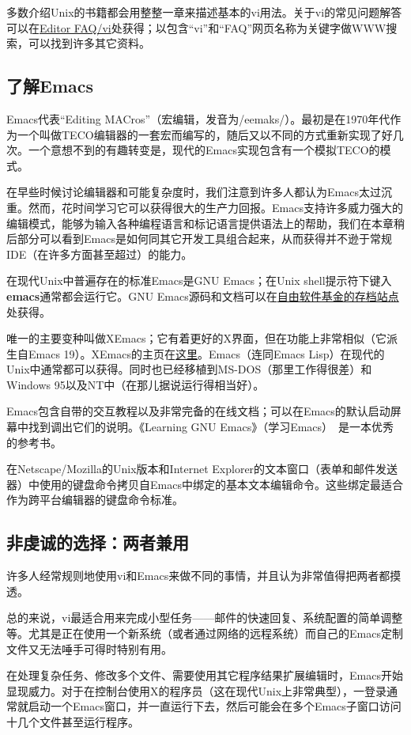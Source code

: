 \documentclass[12pt,oneside]{ctexbook}
\begin{document}
\begin{common-format}
多数介绍Unix的书籍都会用整整一章来描述基本的vi用法。关于vi的常见问题解答可以在\href{http://www.faqs.org/faqs/editor-faq/vi/}{Editor FAQ/vi}处获得；以包含“vi”和“FAQ”网页名称为关键字做WWW搜索，可以找到许多其它资料。


\subsection{了解Emacs}
Emacs代表“Editing MACros”（宏编辑，发音为/eemaks/）。最初是在1970年代作为一个叫做TECO编辑器的一套宏而编写的，随后又以不同的方式重新实现了好几次。一个意想不到的有趣转变是，现代的Emacs实现包含有一个模拟TECO的模式。

在早些时候讨论编辑器和可能复杂度时，我们注意到许多人都认为Emacs太过沉重。然而，花时间学习它可以获得很大的生产力回报。Emacs支持许多威力强大的编辑模式，能够为输入各种编程语言和标记语言提供语法上的帮助，我们在本章稍后部分可以看到Emacs是如何同其它开发工具组合起来，从而获得并不逊于常规IDE（在许多方面甚至超过）的能力。

在现代Unix中普遍存在的标准Emacs是GNU Emacs；在Unix shell提示符下键入\textbf{emacs}通常都会运行它。GNU Emacs源码和文档可以在\href{ftp://gnu.org/pub/gnu}{自由软件基金的存档站点}处获得。

唯一的主要变种叫做XEmacs；它有着更好的X界面，但在功能上非常相似（它派生自Emacs 19）。XEmacs的主页在\href{http://www.xemacs.org/}{这里}。Emacs（连同Emacs Lisp）在现代的Unix中通常都可以获得。同时也已经移植到MS-DOS（那里工作得很差）和Windows 95以及NT中（在那儿据说运行得相当好）。

Emacs包含自带的交互教程以及非常完备的在线文档；可以在Emacs的默认启动屏幕中找到调出它们的说明。《Learning GNU Emacs》（学习Emacs）~\cite{Cameron}是一本优秀的参考书。

在Netscape/Mozilla的Unix版本和Internet Explorer的文本窗口（表单和邮件发送器）中使用的键盘命令拷贝自Emacs中绑定的基本文本编辑命令。这些绑定最适合作为跨平台编辑器的键盘命令标准。

\subsection{非虔诚的选择：两者兼用}
许多人经常规则地使用vi和Emacs来做不同的事情，并且认为非常值得把两者都摸透。

总的来说，vi最适合用来完成小型任务——邮件的快速回复、系统配置的简单调整等。尤其是正在使用一个新系统（或者通过网络的远程系统）而自己的Emacs定制文件又无法唾手可得时特别有用。

在处理复杂任务、修改多个文件、需要使用其它程序结果扩展编辑时，Emacs开始显现威力。对于在控制台使用X的程序员（这在现代Unix上非常典型），一登录通常就启动一个Emacs窗口，并一直运行下去，然后可能会在多个Emacs子窗口访问十几个文件甚至运行程序。


\end{common-format}
\end{document}
